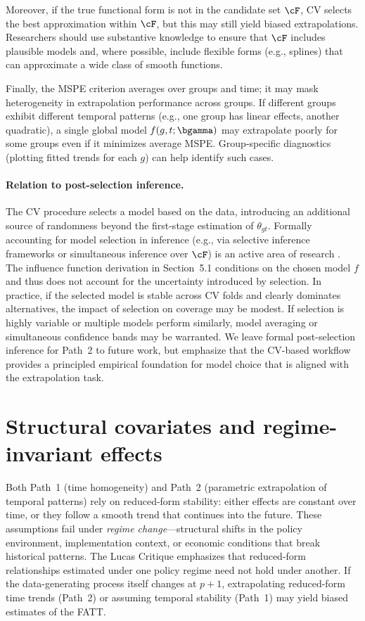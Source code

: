 \documentclass{article}
\begin{document}
Moreover, if the true functional form is not in the candidate set $\cF$, CV selects the best approximation within $\cF$, but this may still yield biased extrapolations. Researchers should use substantive knowledge to ensure that $\cF$ includes plausible models and, where possible, include flexible forms (e.g., splines) that can approximate a wide class of smooth functions.

Finally, the MSPE criterion averages over groups and time; it may mask heterogeneity in extrapolation performance across groups. If different groups exhibit different temporal patterns (e.g., one group has linear effects, another quadratic), a single global model $f(g,t;\bgamma)$ may extrapolate poorly for some groups even if it minimizes average MSPE. Group-specific diagnostics (plotting fitted trends for each $g$) can help identify such cases.

\paragraph{Relation to post-selection inference.}
The CV procedure selects a model based on the data, introducing an additional source of randomness beyond the first-stage estimation of $\theta_{gt}$. Formally accounting for model selection in inference (e.g., via selective inference frameworks or simultaneous inference over $\cF$) is an active area of research \citep{tibshiraniExactPostselectionInference2016,chenValidInferenceModel2021}. The influence function derivation in Section~5.1 conditions on the chosen model $f$ and thus does not account for the uncertainty introduced by selection. In practice, if the selected model is stable across CV folds and clearly dominates alternatives, the impact of selection on coverage may be modest. If selection is highly variable or multiple models perform similarly, model averaging or simultaneous confidence bands may be warranted. We leave formal post-selection inference for Path~2 to future work, but emphasize that the CV-based workflow provides a principled empirical foundation for model choice that is aligned with the extrapolation task.

\section{Structural covariates and regime-invariant effects}

Both Path~1 (time homogeneity) and Path~2 (parametric extrapolation of temporal patterns) rely on reduced-form stability: either effects are constant over time, or they follow a smooth trend that continues into the future. These assumptions fail under \emph{regime change}---structural shifts in the policy environment, implementation context, or economic conditions that break historical patterns. The Lucas Critique \citep{lucasjrEconometricPolicyEvaluation1976} emphasizes that reduced-form relationships estimated under one policy regime need not hold under another. If the data-generating process itself changes at $p+1$, extrapolating reduced-form time trends (Path~2) or assuming temporal stability (Path~1) may yield biased estimates of the FATT.
\end{document}
